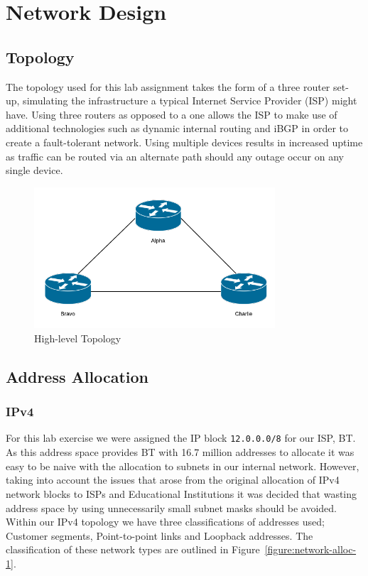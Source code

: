 \chapter{Network Design}

\section{Topology}

The topology used for this lab assignment takes the form of a three router set-
up, simulating the infrastructure a typical Internet Service Provider (ISP)
might have. Using three routers as opposed to a one allows the ISP to make use
of additional technologies such as dynamic internal routing and iBGP in order
to create a fault-tolerant network. Using multiple devices results in increased
uptime as traffic can be routed via an alternate path should any outage occur
on any single device.

\begin{figure}[!ht]
    \caption{High-level Topology}
    \centering
    \includegraphics[width=0.8\textwidth]{images/networkTopology.png}
\end{figure}

\section{Address Allocation}
\subsection{IPv4}
For this lab exercise we were assigned the IP block \texttt{12.0.0.0/8} for our ISP, BT.
As this address space provides BT with 16.7 million addresses to allocate it was
easy to be naive with the allocation to subnets in our internal network.
However, taking into account the issues that arose from the original allocation
of IPv4 network blocks to ISPs and Educational Institutions it was decided that
wasting address space by using unnecessarily small subnet masks should be
avoided. Within our IPv4 topology we have three classifications of addresses
used; Customer segments, Point-to-point links and Loopback addresses. The
classification of these network types are outlined in
Figure~\ref{figure:network-alloc-1}.

